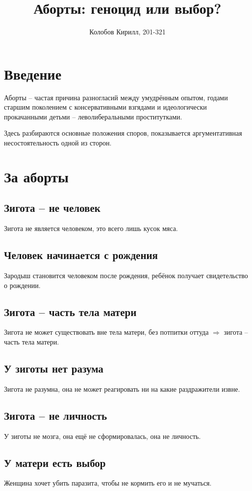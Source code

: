 \documentclass[a4paper,12pt]{report}
\author{Колобов Кирилл, 201-321}
\date{}
\title{Аборты: геноцид или выбор?}
\begin{document}
\maketitle
\tableofcontents


\chapter{Введение}
Аборты -- частая причина разногласий между умудрённым опытом, годами старшим поколением с консервативными взгядами и идеологически прокачанными детьми -- леволиберальными проститутками.

Здесь разбираются основные положения споров, показывается аргументативная несостоятельность одной из сторон.

\chapter{За аборты}
    \section{Зигота -- не человек}
        Зигота не является человеком, это всего лишь кусок мяса.
    \section{Человек начинается с рождения}
        Зародыш становится человеком после рождения, ребёнок получает свидетельство о рождении.
    \section{Зигота -- часть тела матери}
        Зигота не может существовать вне тела матери, без потпитки оттуда $\Rightarrow$ зигота -- часть тела матери.
    \section{У зиготы нет разума}
        Зигота не разумна, она не может реагировать ни на какие раздражители извне.
    \section{Зигота -- не личность}
        У зиготы не мозга, она ещё не сформировалась, она не личность.
    \section{У матери есть выбор}
        Женщина хочет убить паразита, чтобы не кормить его и не мучаться.
\end{document}
